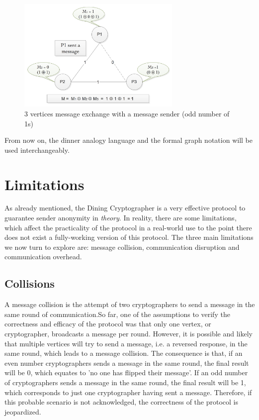 \begin{figure}[h!]
    \centering
    \includegraphics[width=0.70\textwidth]{Images/DCFormalWithMessage.png}
    \caption{3 vertices message exchange with a message sender (odd number of 1s)}
    \label{fig:dcFormalWithMessage}
\end{figure}

From now on, the dinner analogy language and the formal graph notation will be used interchangeably. \newline \newline \newline

\section{Limitations} \label{sec:limitations}
As already mentioned, the Dining Cryptographer is a very effective protocol to guarantee sender anonymity in \textit{theory}. In reality, there are some limitations, which affect the practicality of the protocol in a real-world use to the point there does not exist a fully-working version of this protocol.
The three main limitations we now turn to explore are: message collision, communication disruption and communication overhead. 

\subsection{Collisions}
A message collision is the attempt of two cryptographers to send a message in the same round of communication.So far, one of the assumptions to verify the correctness and efficacy of the protocol was that only one vertex, or cryptographer, broadcasts a message per round. However, it is possible and likely that multiple vertices will try to send a message, i.e. a reversed response, in the same round, which leads to a message collision. The consequence is that, if an even number cryptographers sends a message in the same round, the final result will be 0, which equates to 'no one has flipped their message'. If an odd number of cryptographers sends a message in the same round, the final result will be 1, which corresponds to just one cryptographer having sent a message.
Therefore, if this probable scenario is not acknowledged, the correctness of the protocol is jeopardized.

